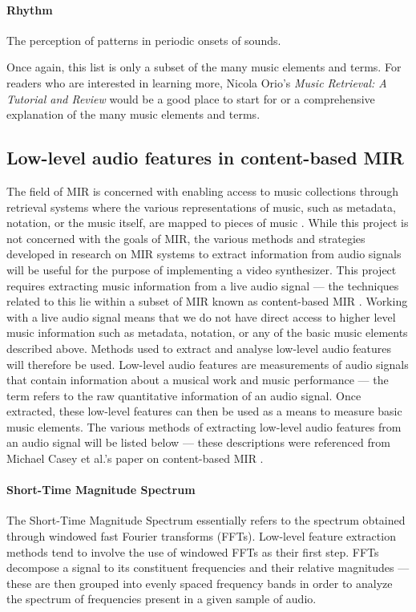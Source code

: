 \documentclass[../main_report2.tex]{subfiles}
\begin{document}
\paragraph{Rhythm} The perception of patterns in periodic onsets of sounds. \\
\par

Once again, this list is only a subset of the many music elements and terms. For readers who are interested in learning more, Nicola Orio's \textit{Music Retrieval: A Tutorial and Review} \cite{Orio2006} would be a good place to start for or a comprehensive explanation of the many music elements and terms.

\subsection{Low-level audio features in content-based MIR}
The field of MIR is concerned with enabling access to music collections through retrieval systems where the various representations of music, such as metadata, notation, or the music itself, are mapped to pieces of music \cite{Downie}. While this project is not concerned with the goals of MIR, the various methods and strategies developed in research on MIR systems to extract information from audio signals will be useful for the purpose of implementing a video synthesizer. This project requires extracting music information from a live audio signal --- the techniques related to this lie within a subset of MIR known as content-based MIR \cite{Casey2008}. Working with a live audio signal means that we do not have direct access to higher level music information such as metadata, notation, or any of the basic music elements described above. Methods used to extract and analyse low-level audio features will therefore be used. Low-level audio features are measurements of audio signals that contain information about a musical work and music performance \cite{Casey2008} --- the term refers to the raw quantitative information of an audio signal. Once extracted, these low-level features can then be used as a means to measure basic music elements. The various methods of extracting low-level audio features from an audio signal will be listed below --- these descriptions were referenced from Michael Casey et al.'s paper on content-based MIR \cite{Casey2008}.

\paragraph{Short-Time Magnitude Spectrum}
The Short-Time Magnitude Spectrum essentially refers to the spectrum obtained through windowed fast Fourier transforms (FFTs). Low-level feature extraction methods tend to involve the use of windowed FFTs as their first step. FFTs decompose a signal to its constituent frequencies and their relative magnitudes --- these are then grouped into evenly spaced frequency bands in order to analyze the spectrum of frequencies present in a given sample of audio.
\end{document}
